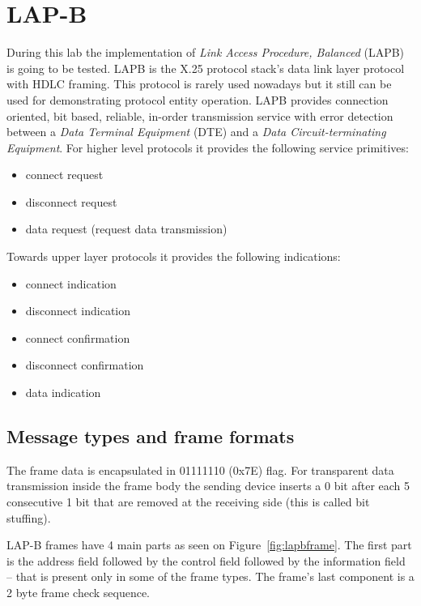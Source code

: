 \documentclass[a4paper]{article}
\begin{document}
\section{LAP-B}

During this lab the implementation of  \emph{Link Access Procedure, Balanced} (LAPB) is going to be tested. LAPB is the
X.25 protocol stack's data link layer protocol with HDLC framing. This protocol is rarely used nowadays but it still
can be used for demonstrating protocol entity operation. LAPB provides connection oriented, bit based, reliable,
in-order transmission service with error detection between a \emph{Data Terminal Equipment} (DTE) and a \emph{Data
    Circuit-terminating Equipment}. For higher level protocols it provides the following service primitives:
\begin{itemize}
    \item connect request
    \item disconnect request
    \item data request (request data transmission)
\end{itemize}
Towards upper layer protocols it provides the following indications:
\begin{itemize}
    \item connect indication
    \item disconnect indication
    \item connect confirmation
    \item disconnect confirmation
    \item data indication
\end{itemize}

\subsection{Message types and frame formats}

The frame data is encapsulated in 01111110 (0x7E) flag. For transparent data transmission inside the frame body the
sending device inserts a 0 bit after each 5 consecutive 1 bit that are removed at the receiving side (this is called bit
stuffing).

LAP-B frames have 4 main parts as seen on Figure~\ref{fig:lapbframe}. The first part is the address field followed by
the control field followed by the information field -- that is present only in some of the frame types. The frame's
last component is a 2 byte frame check sequence.
\end{document}
